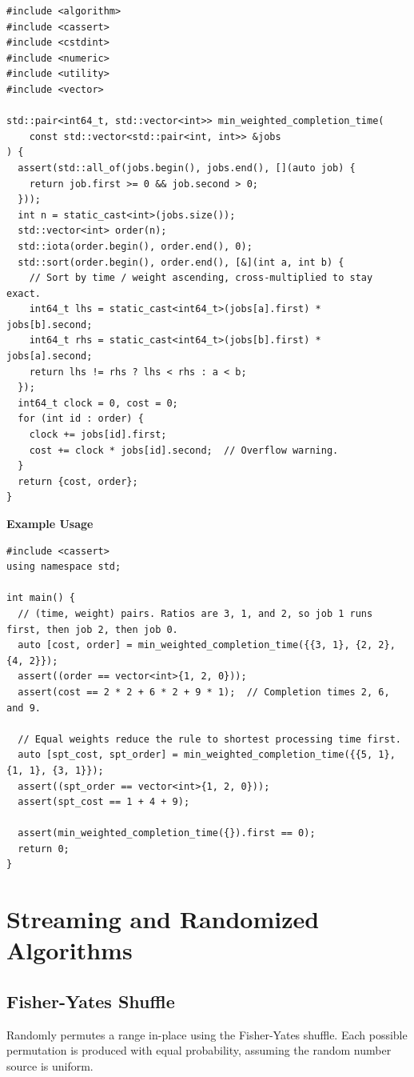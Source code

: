 \begin{lstlisting}[style=cpp]
#include <algorithm>
#include <cassert>
#include <cstdint>
#include <numeric>
#include <utility>
#include <vector>

std::pair<int64_t, std::vector<int>> min_weighted_completion_time(
    const std::vector<std::pair<int, int>> &jobs
) {
  assert(std::all_of(jobs.begin(), jobs.end(), [](auto job) {
    return job.first >= 0 && job.second > 0;
  }));
  int n = static_cast<int>(jobs.size());
  std::vector<int> order(n);
  std::iota(order.begin(), order.end(), 0);
  std::sort(order.begin(), order.end(), [&](int a, int b) {
    // Sort by time / weight ascending, cross-multiplied to stay exact.
    int64_t lhs = static_cast<int64_t>(jobs[a].first) * jobs[b].second;
    int64_t rhs = static_cast<int64_t>(jobs[b].first) * jobs[a].second;
    return lhs != rhs ? lhs < rhs : a < b;
  });
  int64_t clock = 0, cost = 0;
  for (int id : order) {
    clock += jobs[id].first;
    cost += clock * jobs[id].second;  // Overflow warning.
  }
  return {cost, order};
}
\end{lstlisting}
\textbf{Example Usage}\par
\begin{lstlisting}[style=cpp]
#include <cassert>
using namespace std;

int main() {
  // (time, weight) pairs. Ratios are 3, 1, and 2, so job 1 runs first, then job 2, then job 0.
  auto [cost, order] = min_weighted_completion_time({{3, 1}, {2, 2}, {4, 2}});
  assert((order == vector<int>{1, 2, 0}));
  assert(cost == 2 * 2 + 6 * 2 + 9 * 1);  // Completion times 2, 6, and 9.

  // Equal weights reduce the rule to shortest processing time first.
  auto [spt_cost, spt_order] = min_weighted_completion_time({{5, 1}, {1, 1}, {3, 1}});
  assert((spt_order == vector<int>{1, 2, 0}));
  assert(spt_cost == 1 + 4 + 9);

  assert(min_weighted_completion_time({}).first == 0);
  return 0;
}
\end{lstlisting}

\section{\texorpdfstring{Streaming and Randomized Algorithms}{1.6 Streaming and Randomized Algorithms}}
\setcounter{section}{6}
\setcounter{subsection}{0}
\subsection{Fisher-Yates Shuffle}
\label{sec:1.6.1}
Randomly permutes a range in-place using the Fisher-Yates shuffle. Each possible permutation is produced with equal probability, assuming the random number source is uniform.

